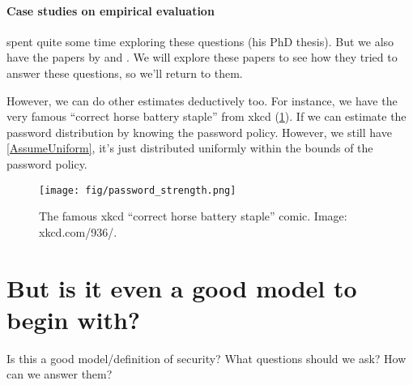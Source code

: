 \paragraph{Case studies on empirical evaluation}

\Textcite{GuessingHumanChosenSecrets2012} spent quite some time exploring these 
questions (his PhD thesis).
But we also have the papers by
\textcite{OfPasswordsAndPeople} and
\textcite{CanLongPasswordsBeSecureAndUsable}.
We will explore these papers to see how they tried to answer these questions, 
so we'll return to them.

However, we can do other estimates deductively too.
For instance, we have the very famous \enquote{correct horse battery staple} 
from xkcd (\cref{xkcd936}).
If we can estimate the password distribution by knowing the password policy.
However, we still have \cref{AssumeUniform}, it's just distributed uniformly 
within the bounds of the password policy.

\begin{frame}
  \begin{figure}[h]
    \texttt{[image: fig/password\_strength.png]}
    \caption{%
      The famous xkcd \enquote{correct horse battery staple} comic.
      Image: xkcd.com/936/.
    }\label{xkcd936}
  \end{figure}
\end{frame}

\section{But is it even a good model to begin with?}

\begin{frame}
  \begin{exercise}
    Is this a good model/definition of security?
    What questions should we ask?
    How can we answer them?
  \end{exercise}

\end{frame}


